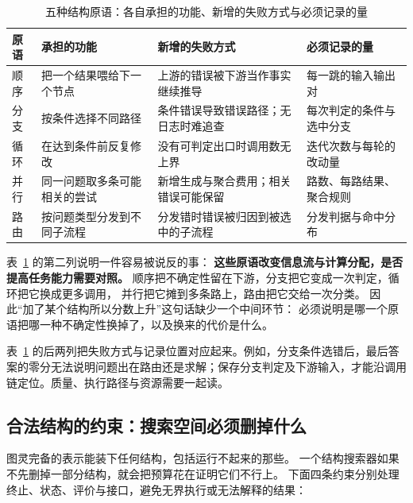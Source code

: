 \begin{table}[htbp]
\centering
\caption{五种结构原语：各自承担的功能、新增的失败方式与必须记录的量}
\label{tab:ch09-primitives}
\begin{tabular}{>{\raggedright\arraybackslash}p{1.6cm}>{\raggedright\arraybackslash}p{3.4cm}>{\raggedright\arraybackslash}p{3.5cm}>{\raggedright\arraybackslash}p{4.0cm}}
\toprule
原语 & 承担的功能 & 新增的失败方式 & 必须记录的量 \\
\midrule
顺序 & 把一个结果喂给下一个节点 & 上游的错误被下游当作事实继续推导 & 每一跳的输入输出对 \\
分支 & 按条件选择不同路径 & 条件错误导致错误路径；无日志时难追查 & 每次判定的条件与选中分支 \\
循环 & 在达到条件前反复修改 & 没有可判定出口时调用数无上界 & 迭代次数与每轮的改动量 \\
并行 & 同一问题取多条可能相关的尝试 & 新增生成与聚合费用；相关错误可能保留 & 路数、每路结果、聚合规则 \\
路由 & 按问题类型分发到不同子流程 & 分发错时错误被归因到被选中的子流程 & 分发判据与命中分布 \\
\bottomrule
\end{tabular}
\end{table}

\begin{sloppypar}
表~\ref{tab:ch09-primitives} 的第二列说明一件容易被说反的事：
\textbf{这些原语改变信息流与计算分配，是否提高任务能力需要对照。}
顺序把不确定性留在下游，分支把它变成一次判定，循环把它换成更多调用，
并行把它摊到多条路上，路由把它交给一次分类。
因此``加了某个结构所以分数上升''这句话缺少一个中间环节：
必须说明是哪一个原语把哪一种不确定性换掉了，以及换来的代价是什么。
\end{sloppypar}

表~\ref{tab:ch09-primitives} 的后两列把失败方式与记录位置对应起来。例如，分支条件选错后，最后答案的零分无法说明问题出在路由还是求解；保存分支判定及下游输入，才能沿调用链定位。质量、执行路径与资源需要一起读。

\subsection{合法结构的约束：搜索空间必须删掉什么}
\label{sec:ch09-legal}

图灵完备的表示能装下任何结构，包括运行不起来的那些。
一个结构搜索器如果不先删掉一部分结构，就会把预算花在证明它们不行上。
下面四条约束分别处理终止、状态、评价与接口，避免无界执行或无法解释的结果：

